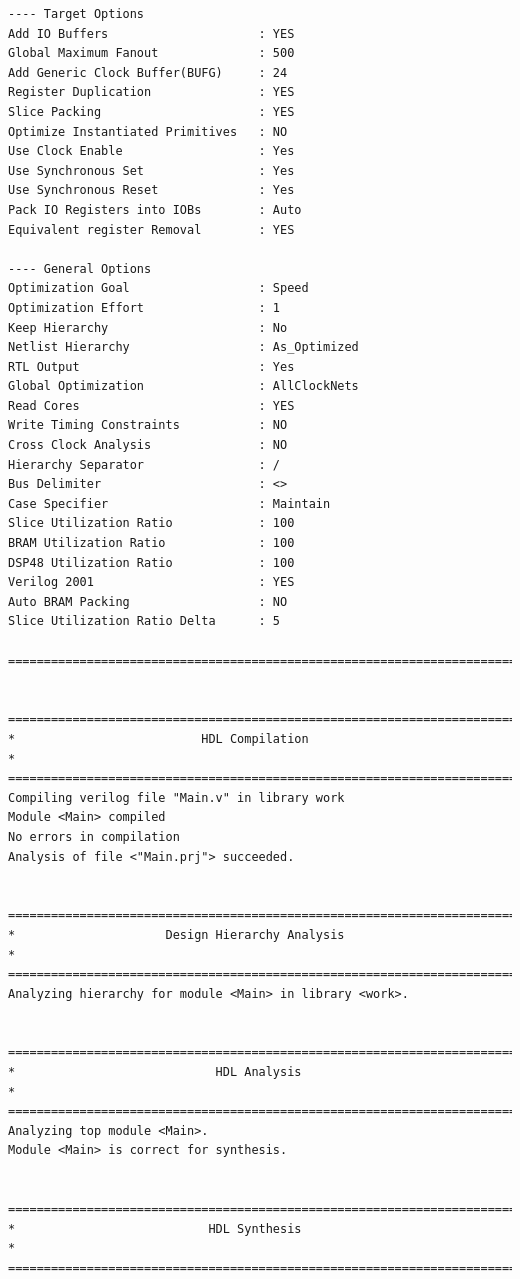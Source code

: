 \documentclass[fleqn]{article}
\begin{document}
\begin{latin}
\begin{lstlisting}[basicstyle=\tiny]
---- Target Options
Add IO Buffers                     : YES
Global Maximum Fanout              : 500
Add Generic Clock Buffer(BUFG)     : 24
Register Duplication               : YES
Slice Packing                      : YES
Optimize Instantiated Primitives   : NO
Use Clock Enable                   : Yes
Use Synchronous Set                : Yes
Use Synchronous Reset              : Yes
Pack IO Registers into IOBs        : Auto
Equivalent register Removal        : YES

---- General Options
Optimization Goal                  : Speed
Optimization Effort                : 1
Keep Hierarchy                     : No
Netlist Hierarchy                  : As_Optimized
RTL Output                         : Yes
Global Optimization                : AllClockNets
Read Cores                         : YES
Write Timing Constraints           : NO
Cross Clock Analysis               : NO
Hierarchy Separator                : /
Bus Delimiter                      : <>
Case Specifier                     : Maintain
Slice Utilization Ratio            : 100
BRAM Utilization Ratio             : 100
DSP48 Utilization Ratio            : 100
Verilog 2001                       : YES
Auto BRAM Packing                  : NO
Slice Utilization Ratio Delta      : 5

=========================================================================


=========================================================================
*                          HDL Compilation                              *
=========================================================================
Compiling verilog file "Main.v" in library work
Module <Main> compiled
No errors in compilation
Analysis of file <"Main.prj"> succeeded.


=========================================================================
*                     Design Hierarchy Analysis                         *
=========================================================================
Analyzing hierarchy for module <Main> in library <work>.


=========================================================================
*                            HDL Analysis                               *
=========================================================================
Analyzing top module <Main>.
Module <Main> is correct for synthesis.


=========================================================================
*                           HDL Synthesis                               *
=========================================================================


\end{lstlisting}
\end{latin}
\end{document}
